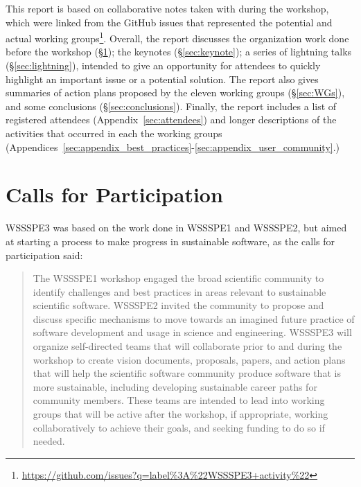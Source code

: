 \documentclass[11pt, oneside]{amsart}
\begin{document}
This report is based on collaborative notes taken with during the workshop,
which were linked from the GitHub issues that represented the potential and
actual working
groups\footnote{\url{https://github.com/issues?q=label\%3A\%22WSSSPE3+activity\%22}}.
Overall, the report discusses the organization work done before the workshop
(\S\ref{sec:preworkshop}); the keynotes (\S\ref{sec:keynote}); a series of
lightning talks (\S\ref{sec:lightning}), intended to give an opportunity for
attendees to quickly highlight an important issue or a potential solution. The
report also gives summaries of action plans proposed by the eleven working
groups (\S\ref{sec:WGs}), and some conclusions (\S\ref{sec:conclusions}).
Finally, the report includes a list of registered attendees
(Appendix~\ref{sec:attendees}) and longer descriptions of the activities that
occurred in each the working groups
(Appendices~\ref{sec:appendix_best_practices}-\ref{sec:appendix_user_community}.)



\section{Calls for Participation} \label{sec:preworkshop}

WSSSPE3 was based on the work done in WSSSPE1 and WSSSPE2, but aimed at starting
a process to make progress in sustainable software, as the calls for
participation said:

\begin{quote} The WSSSPE1 workshop engaged the broad scientific community to
identify challenges and best practices in areas relevant to sustainable
scientific software. WSSSPE2 invited the community to propose and discuss
specific mechanisms to move towards an imagined future practice of software
development and usage in science and engineering. WSSSPE3 will organize
self-directed teams that will collaborate prior to and during the workshop to
create vision documents, proposals, papers, and action plans that will help the
scientific software community produce software that is more sustainable,
including developing sustainable career paths for community members. These teams
are intended to lead into working groups that will be active after the workshop,
if appropriate, working collaboratively to achieve their goals, and seeking
funding to do so if needed. \end{quote}
\end{document}
